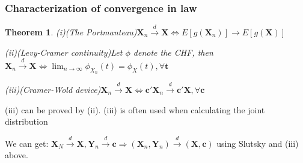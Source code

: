 \documentclass{ctexart}
\newtheorem{theorem}{Theorem}[subsection]
\begin{document}
\subsubsection{Characterization of convergence in law}
\begin{theorem}
  (i)(The Portmanteau)\(\boldsymbol{X}_n \xrightarrow{d}\boldsymbol{X}\iff E[g(\boldsymbol{X}_n)]\to E[g(\boldsymbol{X})]\) 

  (ii)(Levy-Cramer continuity)Let \(\phi\) denote the CHF, then \(\boldsymbol{X}_n \xrightarrow{d}\boldsymbol{X}\iff \lim_{n\to \infty}\phi_{X_n}(t)=\phi_X(t),\forall \boldsymbol{t}\) 

  (iii)(Cramer-Wold device)\(\boldsymbol{X}_n \xrightarrow{d}\boldsymbol{X}\iff \boldsymbol{c}'\boldsymbol{X}_n \xrightarrow{d}\boldsymbol{c}'\boldsymbol{X},\forall \boldsymbol{c}\) 
\end{theorem}
(iii) can be proved by (ii). (iii) is often used when calculating the joint distribution 

We can get: \(\boldsymbol{X}_N \xrightarrow{d}\boldsymbol{X},\boldsymbol{Y}_n \xrightarrow{d}\boldsymbol{c}\Rightarrow (\boldsymbol{X}_n,\boldsymbol{Y}_n)\xrightarrow{d}(\boldsymbol{X},\boldsymbol{c})\) using Slutsky and (iii) above.  
\end{document}
